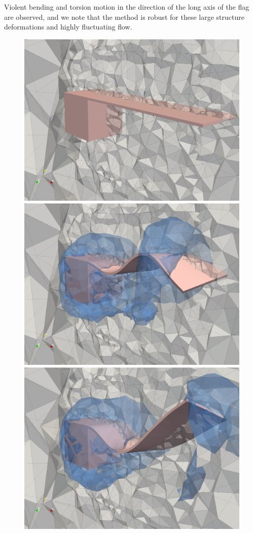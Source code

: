 Violent bending and torsion motion in the direction of the long axis
of the flag are observed, and we note that the method is robust for
these large structure deformations and highly fluctuating flow.

\begin{figure}
\bwfig
  \centering
   \includegraphics[width=\twofigs]{chapters/hoffman-1/png/cube000.png}
  \includegraphics[width=\twofigs]{chapters/hoffman-1/png/cube115.png}\\
  \includegraphics[width=\twofigs]{chapters/hoffman-1/png/cube125.png}

\end{figure}
